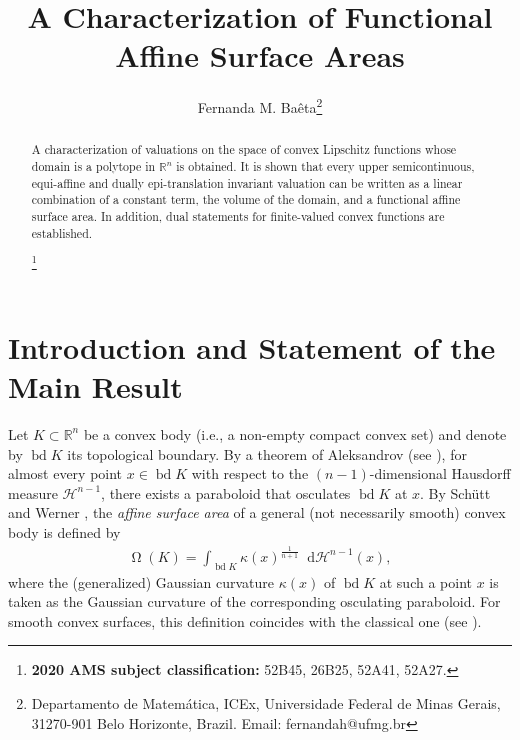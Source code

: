 \documentclass[11pt]{article}
\newcommand\blfootnote[1]{%
\begingroup
\renewcommand\thefootnote{}\footnote{#1}%
\addtocounter{footnote}{-1}%
\endgroup
}
\theoremstyle{definition} %
\newcommand{\dif}{\mathop{}\!\mathrm{d}}
\DeclareMathOperator{\bd}{bd}
\DeclareMathOperator{\as}{\Omega}
\begin{document}
\title{A Characterization of Functional Affine Surface Areas} \author{Fernanda M. Baêta\thanks{Departamento de Matemática, ICEx, Universidade Federal de Minas Gerais, 31270-901 Belo Horizonte, Brazil. Email: fernandah@ufmg.br}}

\date{}




\maketitle
{}
\begin{abstract}
A characterization of valuations on the space of convex Lipschitz  functions whose domain is a polytope in $\mathbb{R}^n$ is obtained. It is shown that every upper semicontinuous, equi-affine and dually epi-translation invariant valuation can be written as a linear combination of a constant term, the volume of the domain, and a functional affine surface area. In addition, dual statements for finite-valued convex functions are established.


\blfootnote{{\bf 2020 AMS subject classification:} 52B45, 26B25,    52A41, 52A27.}
\end{abstract}


\section{Introduction and Statement of the Main Result}

Let $K\subset \mathbb{R}^{n}$ be a convex body (i.e., a non-empty compact convex set) and denote by $\bd K$ its topological boundary. By a theorem of Aleksandrov (see \cite{aleksandrov1939second}), for almost every point $x\in \bd K$ with respect to the $(n-1)$-dimensional Hausdorff measure $\mathcal{H}^{n-1}$, there exists a paraboloid that osculates $\bd K$ at $x$. By Schütt and Werner \cite{schuett1990convex}, the \textit{affine surface area} of a general (not necessarily smooth) convex body is defined by
\begin{align*}
\as(K)= \int_{\bd K}\kappa(x)^\frac{1}{n+1}\dif \mathcal{H}^{n-1}(x),    
\end{align*}
where the (generalized) Gaussian curvature $\kappa(x)$ of $\bd K$ at such a point  $x$ is taken as the Gaussian curvature of the corresponding osculating paraboloid. For smooth convex surfaces, this definition coincides with the classical one (see \cite{blaschke1923differentialgeometrie}).  
\end{document}
